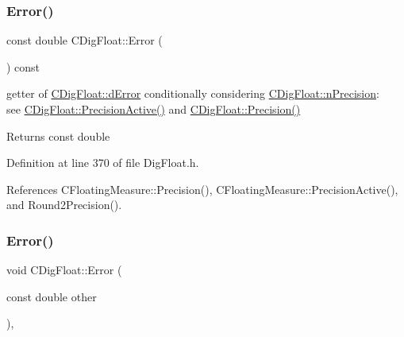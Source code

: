 \subsubsection{\texorpdfstring{Error()}{Error()}\hspace{0.1cm}{\footnotesize\ttfamily [1/2]}}
{\footnotesize\ttfamily const double C\+Dig\+Float\+::\+Error (\begin{DoxyParamCaption}{ }\end{DoxyParamCaption}) const\hspace{0.3cm}{\ttfamily [inline]}}



getter of \hyperlink{classCDigFloat_a25eb3782d1e727ff007a48f8308e3d4d}{C\+Dig\+Float\+::d\+Error} conditionally considering \hyperlink{classCDigFloat_ad580654be35246d14c91482581c0bc11}{C\+Dig\+Float\+::n\+Precision}\+: ~\newline
 see \hyperlink{classCDigFloat_a4d6ca24beda280be719374c2a6b2c64d}{C\+Dig\+Float\+::\+Precision\+Active()} and \hyperlink{classCDigFloat_a95875f6f7246debee0d00b0c41c82aee}{C\+Dig\+Float\+::\+Precision()} 

\begin{DoxyReturn}{Returns}
const double 
\end{DoxyReturn}


Definition at line 370 of file Dig\+Float.\+h.



References C\+Floating\+Measure\+::\+Precision(), C\+Floating\+Measure\+::\+Precision\+Active(), and Round2\+Precision().

\mbox{\label{classCDigFloat_a5fdd0d560073f5d06b41c7f66933635e}} 
\subsubsection{\texorpdfstring{Error()}{Error()}\hspace{0.1cm}{\footnotesize\ttfamily [2/2]}}
{\footnotesize\ttfamily void C\+Dig\+Float\+::\+Error (\begin{DoxyParamCaption}\item[{const double}]{other }\end{DoxyParamCaption})\hspace{0.3cm}{\ttfamily [inline]}, {\ttfamily [protected]}}



